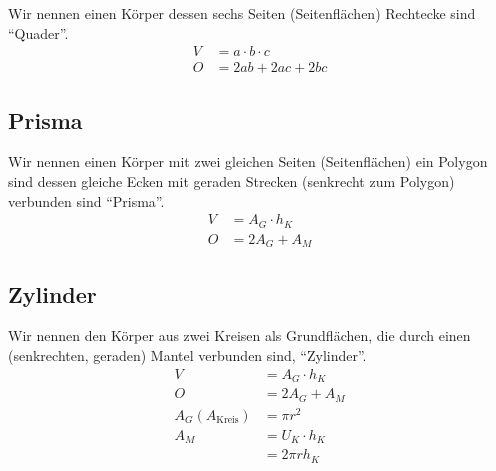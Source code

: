 \documentclass[a4paper]{book}%
\theoremstyle{definition}
\begin{document}
Wir nennen einen Körper dessen sechs Seiten (Seitenflächen) Rechtecke sind \enquote{Quader}.
\begin{align}\label{eqn:fsQuader}
  V &= a \cdot b \cdot c \\
  O &= 2ab + 2ac + 2bc
\end{align}


\subsection{Prisma}

Wir nennen einen Körper mit zwei gleichen Seiten (Seitenflächen) ein Polygon sind dessen gleiche Ecken mit geraden Strecken (senkrecht zum Polygon) verbunden sind \enquote{Prisma}.
\begin{align}\label{eqn:fsPrisma}
  V &= A_G \cdot h_K \\
  O &= 2 A_G + A_M
\end{align}


\subsection{Zylinder}

Wir nennen den Körper aus zwei Kreisen als Grundflächen, die durch einen (senkrechten, geraden) Mantel verbunden sind, \enquote{Zylinder}.
\begin{align}\label{eqn:fsZylinder}
  V &= A_G \cdot h_K \\
  O &= 2 A_G + A_M\\
  A_G (A_{\text{Kreis}}) &= \pi r^2\\
  A_M &= U_K \cdot h_K\\
    &= 2 \pi r h_K
\end{align}

\printindex
\printbibliography
\end{document}

